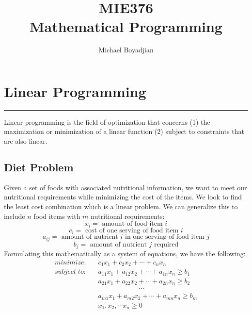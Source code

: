 \documentclass[11pt]{article}
\begin{document}
\title{MIE376  \\ Mathematical Programming}
\author{Michael Boyadjian}
\maketitle
\pagebreak

\tableofcontents

\pagebreak

\bigskip
\bigskip
\bigskip


\section{Linear Programming}
\hrule \vspace{15pt}
Linear programming is the field of optimization that concerns (1) the maximization or minimization of a linear function (2) subject to constraints that are also linear.
\subsection{Diet Problem}
Given a set of foods with associated nutritional information, we want to meet our nutritional requirements while minimizing the cost of the items. We look to find the least cost combination which is a linear problem. We can generalize this to include $n$ food items with $m$ nutritional requirements:
$$ x_i = \text{ amount of food item } i $$
$$ c_i = \text{ cost of one serving of food item } i $$
$$ a_{ij} = \text{ amount of nutrient } i \text{ in one serving of food item } j $$
$$ b_j = \text{ amount of nutrient } j \text{ required}  $$
Formulating this mathematically as a system of equations, we have the following: 
\begin{align*}
minimize : & \; \; \; c_1x_1 + c_2x_2 + \cdots+ c_nx_n \\ 
subject \; to : & \; \; \; a_{11} x_1 + a_{12}x_2 + \cdots + a_{1n} x_n \geq b_1 \\
& \; \; \; a_{21} x_1 + a_{22}x_2 + \cdots + a_{2n} x_n \geq b_2 \\ 
&  \; \; \; \quad \quad \quad \quad \quad \quad  \cdots \\
& \; \; \; a_{m1} x_1 + a_{m2}x_2 + \cdots + a_{mn} x_n \geq b_m \\ 
&  \; \; \; x_1, x_2,  \cdots x_n \geq 0 
\end{align*}
\end{document}
